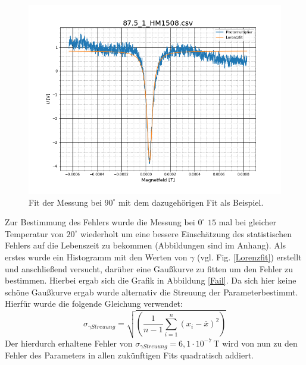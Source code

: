 \begin{figure}[ht]
	\includegraphics[scale=0.5]{Bild/90GradLorenz}
	\centering
	\caption[Fit der Lorentzkurve bei für 90Grad]{Fit der Messung bei $90^\circ$ mit dem dazugehörigen Fit als Beispiel.}
	\label{Lo90}
\end{figure}
\FloatBarrier
Zur Bestimmung des Fehlers wurde die Messung bei $0^\circ$ $15$ mal bei gleicher Temperatur von $20^\circ$ wiederholt um eine bessere Einschätzung des statistischen Fehlers auf die Lebenszeit zu bekommen (Abbildungen sind im Anhang). Als erstes wurde ein Histogramm mit den Werten von $\gamma$ (vgl. Fig. \ref{Lorenzfit}) erstellt und anschließend versucht, darüber eine Gaußkurve zu fitten um den Fehler zu bestimmen. Hierbei ergab sich die Grafik in Abbildung \ref{Fail}. Da sich hier keine schöne Gaußkurve ergab wurde alternativ die Streuung der Parameterbestimmt. Hierfür wurde die folgende Gleichung verwendet:
\begin{equation}
	\sigma_{\gamma Streuung}=\sqrt{\left(\frac{1}{n-1}\sum_{i=1}^{n}(x_i-\bar{x})^2\right)}
\end{equation}
Der hierdurch erhaltene Fehler  von $\sigma_{\gamma Streuung}=6,1\cdot10^{-7}\,$T wird von nun zu den Fehler des Parameters in allen zukünftigen Fits quadratisch addiert.
